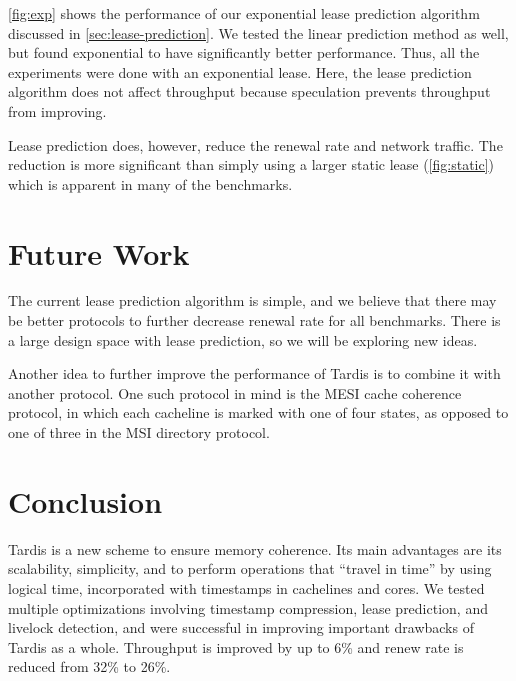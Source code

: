 \documentclass[12pt]{article}
\begin{document}
	\cref{fig:exp} shows the performance of our exponential lease 
	prediction algorithm discussed in \cref{sec:lease-prediction}. We tested the linear prediction method as well, but found exponential to have significantly better performance. Thus, all the experiments were done with an exponential lease.
	Here, the lease prediction algorithm does not affect throughput 
	because speculation prevents throughput from improving.
	
	Lease prediction does, however, reduce the renewal rate and network 
	traffic. The reduction is more significant than simply using a larger 
	static lease (\cref{fig:static}) which is apparent in many of the 
	benchmarks.
	
	\section{Future Work}
	
	The current lease prediction algorithm is simple, and we believe that 
	there may be better protocols to further decrease renewal rate for all 
	benchmarks. There is a large design space with lease prediction, so we 
	will be exploring new ideas.
	
	Another idea to further improve the performance of Tardis is to 
	combine it with another protocol. One such protocol in mind is the 
	MESI cache coherence protocol, in which each cacheline is marked with 
	one of four states, as opposed to one of three in the MSI directory 
	protocol.
	
	\section{Conclusion}
	
	Tardis is a new scheme to ensure memory coherence. Its main advantages 
	are its scalability, simplicity, and to perform operations that 
	``travel in time'' by using logical time, incorporated with timestamps 
	in cachelines and cores. We tested multiple optimizations involving 
	timestamp compression, lease prediction, and livelock detection, and 
	were successful in improving important drawbacks of Tardis as a whole. Throughput is improved by up to 6\% and renew rate is reduced from 32\% to 26\%.
	
	{
		
		
	}
\end{document}

